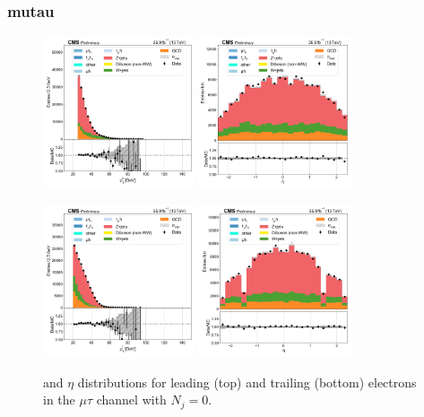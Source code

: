 \subsubsection{mutau}

\begin{figure}[htb!]
    \centering
    \includegraphics[width=0.4\textwidth]{chapters/Analysis/sectionPlots/figures/data_mc_overlays/mutau_2016_cat_eq0_eq0_signal_linear_lepton_lepton1_pt}
    \includegraphics[width=0.4\textwidth]{chapters/Analysis/sectionPlots/figures/data_mc_overlays/mutau_2016_cat_eq0_eq0_signal_linear_lepton_lepton1_eta}

    \includegraphics[width=0.4\textwidth]{chapters/Analysis/sectionPlots/figures/data_mc_overlays/mutau_2016_cat_eq0_eq0_signal_linear_lepton_lepton2_pt}
    \includegraphics[width=0.4\textwidth]{chapters/Analysis/sectionPlots/figures/data_mc_overlays/mutau_2016_cat_eq0_eq0_signal_linear_lepton_lepton2_eta}
    \caption{\pt and $\eta$ distributions for leading (top) and trailing
    (bottom) electrons in the $\mu\tau$ channel with $N_{j} = 0$.}
    \label{fig:analysis:plots:mutau_1_kinematic}
\end{figure}

